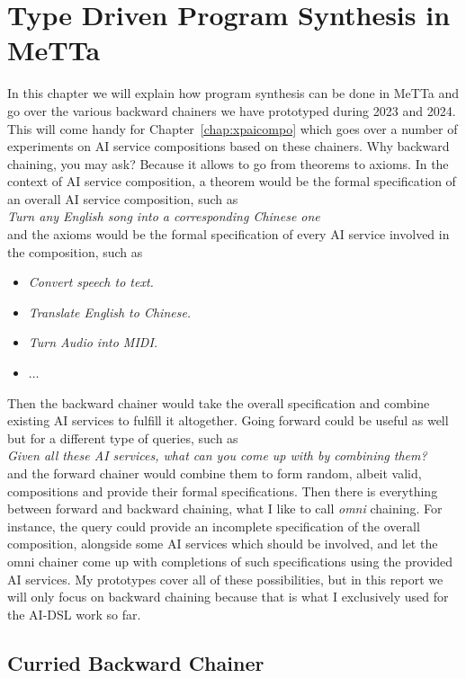\documentclass[]{report}
\begin{document}
\chapter{Type Driven Program Synthesis in MeTTa}
\label{chap:chainers}
In this chapter we will explain how program synthesis can be done in
MeTTa and go over the various backward chainers we have prototyped
during 2023 and 2024.  This will come handy for
Chapter~\ref{chap:xpaicompo} which goes over a number of experiments
on AI service compositions based on these chainers.  Why backward
chaining, you may ask?  Because it allows to go from theorems to
axioms.  In the context of AI service composition, a theorem would be
the formal specification of an overall AI service composition, such
as\\

\emph{Turn any English song into a corresponding Chinese one}\\[0.4cm]
and the axioms would be the formal specification of every AI service
involved in the composition, such as
\begin{itemize}
\item \emph{Convert speech to text.}
\item \emph{Translate English to Chinese.}
\item \emph{Turn Audio into MIDI.}
\item $\dots$
\end{itemize}
Then the backward chainer would take the overall specification and
combine existing AI services to fulfill it altogether.  Going forward
could be useful as well but for a different type of queries, such as\\

\emph{Given all these AI services, what can you come up with by
combining them?}\\[0.4cm] and the forward chainer would combine them
to form random, albeit valid, compositions and provide their formal
specifications.  Then there is everything between forward and backward
chaining, what I like to call \emph{omni} chaining.  For instance, the
query could provide an incomplete specification of the overall
composition, alongside some AI services which should be involved, and
let the omni chainer come up with completions of such specifications
using the provided AI services.  My prototypes cover all of these
possibilities, but in this report we will only focus on backward
chaining because that is what I exclusively used for the AI-DSL work
so far.
\section{Curried Backward Chainer}
\label{sec:curriedbc}
\end{document}
